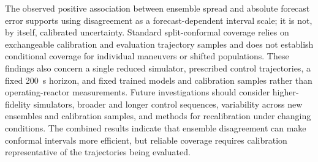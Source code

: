 The observed positive association between ensemble spread and absolute forecast error supports using disagreement as a forecast-dependent interval scale; it is not, by itself, calibrated uncertainty. Standard split-conformal coverage relies on exchangeable calibration and evaluation trajectory samples and does not establish conditional coverage for individual maneuvers or shifted populations. These findings also concern a single reduced simulator, prescribed control trajectories, a fixed 200~s horizon, and fixed trained models and calibration samples rather than operating-reactor measurements. Future investigations should consider higher-fidelity simulators, broader and longer control sequences, variability across new ensembles and calibration samples, and methods for recalibration under changing conditions. The combined results indicate that ensemble disagreement can make conformal intervals more efficient, but reliable coverage requires calibration representative of the trajectories being evaluated.
